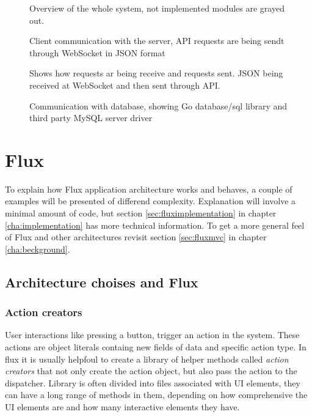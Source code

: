 \begin{figure}[h]
  \scalebox{1}{}
  \caption{Overview of the whole system, not implemented modules are grayed out.}
  \label{fig:systemoverview}
\end{figure}

\begin{figure}[h]
  \scalebox{1}{}
  \caption{Client communication with the server, API requests are being sendt through WebSocket in JSON format}
  \label{fig:clientoverview}
\end{figure}

\begin{figure}[h]
  \scalebox{1}{}
  \caption{Shows how requests ar being receive and requests sent. JSON being received at WebSocket and then sent through API.}
  \label{fig:serveroverview}
\end{figure}

\begin{figure}[h]
  \scalebox{1}{}
  \caption{Communication with database, showing Go database/sql library and third party MySQL server driver \cite{ziutekdriver}}
  \label{fig:databaseoverview}
\end{figure}

\newpage

\section{Flux}
To explain how Flux application architecture works and behaves, a couple of examples will be presented of differend complexity. Explanation will involve a minimal amount of code, but section \ref{sec:fluximplementation} in chapter \ref{cha:implementation} has more technical information. To get a more general feel of Flux and other architectures revisit section \ref{sec:fluxmvc} in chapter \ref{cha:beckground}.

\subsection{Architecture choises and Flux}
\subsubsection*{Action creators}
User interactions like pressing a button, trigger an action in the system. These actions are object literals containg new fields of data and specific action type. In flux it is usually helpfoul to create a library of helper methods called \emph{action creators} that not only create the action object, but also pass the action to the dispatcher. Library is often divided into files associated with UI elements, they can have a long range of methods in them, depending on how comprehensive the UI elements are and how many interactive elements they have.

